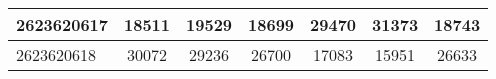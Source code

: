 \begin{adjustbox}{center}
\begin{tabular}{|l||c|c|c|c|c|c|}
\hline
2623620617 & \cellcolor[RGB]{223, 223, 251} 18511 & \cellcolor[RGB]{252, 232, 232} 19529 & \cellcolor[RGB]{232, 232, 252} 18699 & \cellcolor[RGB]{235, 71, 71} 29470 & \cellcolor[RGB]{235, 71, 71} 31373 & \cellcolor[RGB]{232, 232, 252} 18743 \\
\hline
2623620618 & \cellcolor[RGB]{252, 232, 232} 30072 & \cellcolor[RGB]{253, 237, 237} 29236 & \cellcolor[RGB]{255, 255, 255} 26700 & \cellcolor[RGB]{218, 218, 251} 17083 & \cellcolor[RGB]{214, 214, 250} 15951 & \cellcolor[RGB]{255, 255, 255} 26633 \\
\hline
\end{tabular}
\end{adjustbox}

